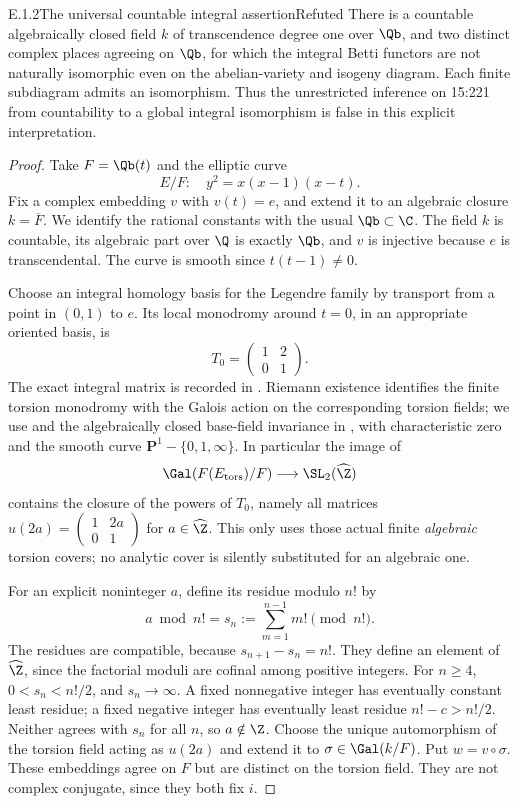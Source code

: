 \begin{result}{E.1.2}{The universal countable integral assertion}{Refuted}
There is a countable algebraically closed field $k$ of transcendence degree one over $\Qb$, and two distinct complex places agreeing on $\Qb$, for which the integral Betti functors are not naturally isomorphic even on the abelian-variety and isogeny diagram. Each finite subdiagram admits an isomorphism. Thus the unrestricted inference on 15:221 from countability to a global integral isomorphism is false in this explicit interpretation.
\end{result}
\begin{proof}
Take $F=\Qb(t)$ and the elliptic curve
\[
 E/F:\quad y^2=x(x-1)(x-t).
\]
Fix a complex embedding $v$ with $v(t)=e$, and extend it to an algebraic closure $k=\overline F$. We identify the rational constants with the usual $\Qb\subset\C$. The field $k$ is countable, its algebraic part over $\Q$ is exactly $\Qb$, and $v$ is injective because $e$ is transcendental. The curve is smooth since $t(t-1)\ne0$.

Choose an integral homology basis for the Legendre family by transport from a point in $(0,1)$ to $e$. Its local monodromy around $t=0$, in an appropriate oriented basis, is
\[
 T_0=\begin{pmatrix}1&2\\0&1\end{pmatrix}.
\]
The exact integral matrix is recorded in \cite[Example 5.2, pp.~16--17]{OSU2024}. Riemann existence identifies the finite torsion monodromy with the Galois action on the corresponding torsion fields; we use \cite[Corollary 3.7]{OSU2024} and the algebraically closed base-field invariance in \cite[Theorem 1.1]{Landesman2024}, with characteristic zero and the smooth curve $\mathbf P^1-\{0,1,\infty\}$. In particular the image of
\[
 \Gal(F(E_{\mathrm{tors}})/F)\longrightarrow\SL_2(\widehat\Z)
\]
contains the closure of the powers of $T_0$, namely all matrices $u(2a)=\left(\begin{smallmatrix}1&2a\\0&1\end{smallmatrix}\right)$ for $a\in\widehat\Z$. This only uses those actual finite \emph{algebraic} torsion covers; no analytic cover is silently substituted for an algebraic one.

For an explicit noninteger $a$, define its residue modulo $n!$ by
\[
 a\bmod n!=s_n:=\sum_{m=1}^{n-1}m!\pmod {n!}.
\]
The residues are compatible, because $s_{n+1}-s_n=n!$. They define an element of $\widehat\Z$, since the factorial moduli are cofinal among positive integers. For $n\ge4$, $0<s_n<n!/2$, and $s_n\to\infty$. A fixed nonnegative integer has eventually constant least residue; a fixed negative integer has eventually least residue $n!-c>n!/2$. Neither agrees with $s_n$ for all $n$, so $a\notin\Z$. Choose the unique automorphism of the torsion field acting as $u(2a)$ and extend it to $\sigma\in\Gal(k/F)$. Put $w=v\circ\sigma$. These embeddings agree on $F$ but are distinct on the torsion field. They are not complex conjugate, since they both fix $i$.


\end{proof}
